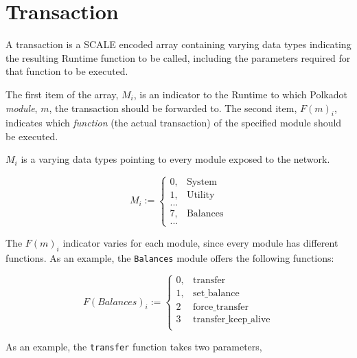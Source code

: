 \newpage
\section{Transaction}

A transaction is a SCALE encoded array containing varying data types indicating
the resulting Runtime function to be called, including the parameters required
for that function to be executed.
\newline

The first item of the array, $M_i$, is an indicator to the Runtime to which
Polkadot \textit{module}, $m$, the transaction should be forwarded to. The second
item, $F(m)_i$, indicates which \textit{function} (the actual transaction) of the
specified module should be executed.
\newline

$M_i$ is a varying data types pointing to every module exposed to the network.

\[
M_i :=
\begin{cases}
0, & \text{System} \\
1, & \text{Utility} \\
... & \\
7, & \text{Balances} \\
... &
\end{cases}
\]

The $F(m)_i$ indicator varies for each module, since every module has different
functions. As an example, the \verb|Balances| module offers the following
functions:

\[
F(Balances)_i :=
\begin{cases}
0, & \text{transfer} \\
1, & \text{set\_balance} \\
2 & \text{force\_transfer} \\
3 & \text{transfer\_keep\_alive} \\
\end{cases}
\]

As an example, the \verb|transfer| function takes two parameters, 
